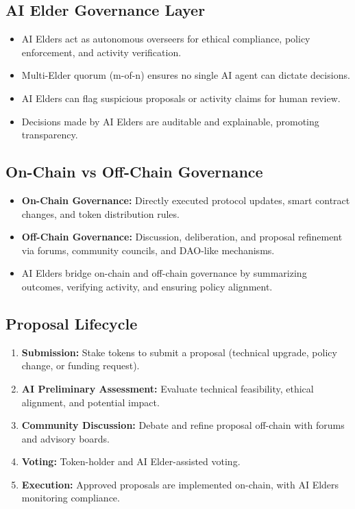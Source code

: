 \documentclass[11pt,a4paper]{article}
\begin{document}
\subsection{AI Elder Governance Layer}
\begin{itemize}
    \item AI Elders act as autonomous overseers for ethical compliance, policy enforcement, and activity verification.  
    \item Multi-Elder quorum (m-of-n) ensures no single AI agent can dictate decisions.  
    \item AI Elders can flag suspicious proposals or activity claims for human review.  
    \item Decisions made by AI Elders are auditable and explainable, promoting transparency.  
\end{itemize}

\subsection{On-Chain vs Off-Chain Governance}
\begin{itemize}
    \item \textbf{On-Chain Governance:} Directly executed protocol updates, smart contract changes, and token distribution rules.  
    \item \textbf{Off-Chain Governance:} Discussion, deliberation, and proposal refinement via forums, community councils, and DAO-like mechanisms.  
    \item AI Elders bridge on-chain and off-chain governance by summarizing outcomes, verifying activity, and ensuring policy alignment.  
\end{itemize}

\subsection{Proposal Lifecycle}
\begin{enumerate}
    \item \textbf{Submission:} Stake tokens to submit a proposal (technical upgrade, policy change, or funding request).  
    \item \textbf{AI Preliminary Assessment:} Evaluate technical feasibility, ethical alignment, and potential impact.  
    \item \textbf{Community Discussion:} Debate and refine proposal off-chain with forums and advisory boards.  
    \item \textbf{Voting:} Token-holder and AI Elder-assisted voting.  
    \item \textbf{Execution:} Approved proposals are implemented on-chain, with AI Elders monitoring compliance.  
\end{enumerate}
\end{document}
